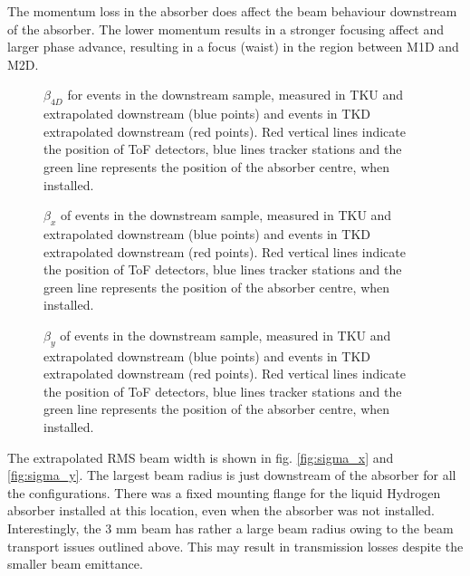 The momentum loss in the absorber does affect the beam behaviour downstream of 
the absorber. The lower momentum results in a stronger focusing affect and
larger phase advance, resulting in a focus (waist) in the region between M1D and
M2D.

\begin{figure}[!tbh]
    \centering
    {$\beta_{4D}$ for events in the downstream sample, measured in TKU and 
    extrapolated downstream (blue points) and events in TKD extrapolated 
    downstream (red points). Red vertical lines indicate the position of ToF
    detectors, blue lines tracker stations and the green line represents the
    position of the absorber centre, when installed. \label{fig:beta_4d}} 
\end{figure}

\begin{figure}[!tbh]
    \centering
    {$\beta_{x}$ of events in the downstream sample, measured in TKU and 
     extrapolated downstream (blue points) and events in TKD extrapolated 
     downstream (red points). Red vertical lines indicate the position of ToF
    detectors, blue lines tracker stations and the green line represents the
    position of the absorber centre, when installed. \label{fig:beta_x}}
\end{figure}

\begin{figure}[!tbh]
    \centering
    {$\beta_{y}$ of events in the downstream sample, measured in TKU and 
     extrapolated downstream (blue points) and events in TKD extrapolated 
     downstream (red points). Red vertical lines indicate the position of ToF
    detectors, blue lines tracker stations and the green line represents the
    position of the absorber centre, when installed. \label{fig:beta_y}}
\end{figure}

The extrapolated RMS beam width is shown in fig. \ref{fig:sigma_x} and
\ref{fig:sigma_y}. The largest beam radius is just downstream of the absorber 
for all the configurations. There was a fixed mounting flange for the liquid 
Hydrogen absorber installed at this location, even when the absorber was not
installed. Interestingly, the 3 mm beam has 
rather a large beam radius owing to the beam transport issues outlined above.
This may result in transmission losses despite the smaller beam emittance.

